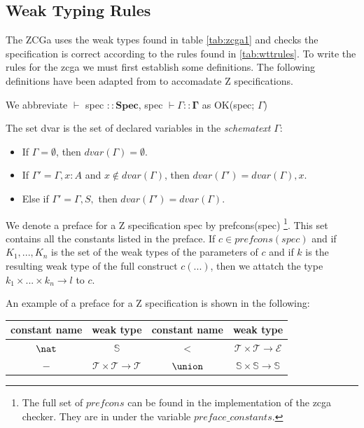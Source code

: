 \subsection{Weak Typing Rules}

The ZCGa uses the weak types found in table \ref{tab:zcga1} and checks the
specification is correct according to the rules found in \ref{tab:wttrules}. To
write the rules for the \gls{zcga} we must first establish some definitions. The
following definitions have been adapted from \cite{wtt} to accomadate Z
specifications.

\begin{defin}
We abbreviate $\vdash$ spec $\mathbf{::Spec}$, spec $\vdash \Gamma
\mathbf{::\Gamma}$ as OK(spec; $\Gamma$)
\end{defin}

\begin{defin} The set dvar is the set of declared variables in the
\emph{schematext} $\Gamma$:
\begin{itemize}
\item If $\Gamma = \emptyset$, then $dvar(\Gamma) = \emptyset$.
\item If $\Gamma' = \Gamma, x:A$ and $x \notin dvar(\Gamma)$, then
$dvar(\Gamma') = dvar(\Gamma), x$.
\item Else if $\Gamma' =\Gamma,S,$ then $dvar(\Gamma') = dvar(\Gamma)$.
\end{itemize}
\end{defin}

\begin{defin} We denote a preface for a Z specification spec by prefcons(spec)
\footnote{The full set of $prefcons$ can be found in the implementation of the
\gls{zcga} checker. They are in under the variable $preface\_constants$.}. This
set contains all the constants listed in the preface. If $c \in prefcons(spec)$
and if $K_{1},...,K_{n}$ is the set of the weak types of the parameters of $c$
and if $k$ is the resulting weak type of the full construct $c(...)$, then we
attatch the type $k_{1} \times ... \times k_{n} \rightarrow l$ to $c$.
\end{defin}

\begin{exam}

\end{exam} An example of a preface for a Z specification is shown in the
following:

\begin{tabular}{| c | c || c | c |}
\hline
constant name & weak type & constant name & weak type \\
\hline
$\nat$ & $\mathbb{S}$ & $<$ & $\mathcal{T} \times \mathcal{T} \rightarrow
\mathcal{E}$ \\
$-$ & $\mathcal{T} \times \mathcal{T} \rightarrow \mathcal{T}$ & $\union$ &
$\mathbb{S} \times \mathbb{S} \rightarrow \mathbb{S} $ \\
\hline
\end{tabular}

